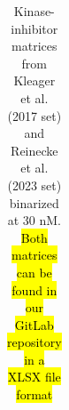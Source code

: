 \clearpage
\begin{table}[h!]
    \centering
    \caption{Kinase-inhibitor matrices from Kleager et al. (2017 set)\cite{klaeger_target_2017} and Reinecke et al. (2023 set)\cite{reinecke_chemical_2023} binarized at 30 nM. \hl{Both matrices can be found in our GitLab repository in a XLSX file format}}
    \label{PocketVec_TableS2}
    \begin{tabular}{|c|c|c|c|}
    \end{tabular}
\end{table}